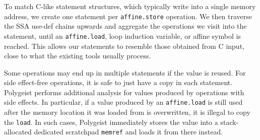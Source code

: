 \documentclass[sigplan]{acmart}
\newcommand{\icode}[1]{{\texttt {#1}}}
\newcommand{\tool}{Polygeist\xspace}
\newcommand{\scop}{SCoP\xspace}
\begin{document}

To match C-like statement structures, which typically write into a single memory address, we create one statement per \icode{affine.store} operation. We then traverse the SSA use-def chains upwards and aggregate the operations we visit into the statement, until an \icode{affine.load}, loop induction variable, or affine symbol is reached.
This allows our statements to resemble those obtained from C input, close to what the existing tools usually process.

Some operations may end up in multiple statements if the value is reused. For side effect-free operations, it is safe to just have a copy in each statement. \tool performs additional analysis for values produced by operations with side effects. In particular,
if a value produced by an \icode{affine.load} is still used after the memory location it was loaded from is overwritten, it is illegal to copy the \icode{load}. In such cases, \tool immediately stores the value into a stack-allocated dedicated scratchpad \icode{memref} and loads it from there instead.

\end{document}
